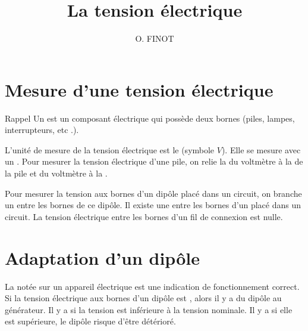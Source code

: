 \documentclass[xcolor={dvipsnames}]{beamer}
\title{La tension électrique}
\author{O. FINOT}\institute{Collège S$^t$ Bernard}
\begin{document}
\begin{frame}
  \titlepage 
\end{frame}

\section{Mesure d'une tension électrique}



\begin{frame}
	\begin{block}{Rappel}
		Un  est un composant électrique qui possède deux bornes (piles, lampes, interrupteurs, etc .).
	\end{block}
\end{frame}



\begin{frame}

\begin{alertblock}{}
	L'unité de mesure de la tension électrique est le  (symbole $V$). Elle se mesure avec un .
	Pour mesurer la tension électrique d'une pile, on relie la  du voltmètre à la  de la pile et  du voltmètre à la .
	
	Pour mesurer la tension aux bornes d'un dipôle placé dans un circuit, on branche un  entre les bornes de ce dipôle. Il existe une  entre les bornes d'un  placé dans un circuit.
	La tension électrique entre les bornes d'un fil de connexion est nulle.
\end{alertblock}
\end{frame}


\section{Adaptation d'un dipôle}

\begin{frame}
\begin{alertblock}{}
		La  notée sur un appareil électrique est une indication de fonctionnement correct.
	Si la tension électrique aux bornes d'un dipôle est , alors il y a  du dipôle au générateur. 
	Il y a  si la tension est inférieure à la tension nominale. Il y a  si elle est supérieure, le dipôle risque d'être détérioré.
\end{alertblock}
\end{frame}
\end{document}

